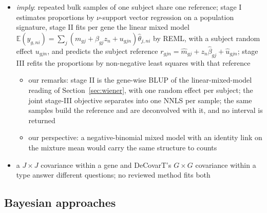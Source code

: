 \begin{itemize}
\begin{itemize}
    \item our remark: since \(\mathbf{1}^{\top}\boldsymbol{p}_{\cdot i}=1\),
          \(\boldsymbol{p}_{\cdot i}^{\top}(\boldsymbol{\Gamma}_{g}+c\mathbf{1}\mathbf{1}^{\top})\boldsymbol{p}_{\cdot i}=\boldsymbol{p}_{\cdot i}^{\top}\boldsymbol{\Gamma}_{g}\boldsymbol{p}_{\cdot i}+c\), so the constant
          part of \(\boldsymbol{\Gamma}_{g}\) and \(\tau_{g}^{2}\) are identified only together; the choice still moves the
          profiles of Theorem~1 and the cross-type correlations
    \item the von Neumann entropy of the cross-type correlation only stratifies genes at the median for evaluation; it
          does not filter them \cite[pp.~19--20]{chenUnicoUnifiedModelCell2025}
  \end{itemize}
  \item \emph{imply}: repeated bulk samples of one subject share one reference; stage I estimates proportions by
        \(\nu\)-support vector regression on a population signature, stage II fits per gene the linear mixed model
        \(\mathbb{E}(y_{g,ni})=\sum_{j}(m_{gj}+\beta_{gj}z_{n}+u_{gjn})\hat\theta_{j,ni}\) by REML, with a subject random effect
        \(u_{gjn}\), and predicts the subject reference \(r_{gjn}=\hat m_{gj}+z_{n}\hat\beta_{gj}+\hat u_{gjn}\); stage III refits
        the proportions by non-negative least squares with that reference \cite[pp.~4--5]{mengImplyImprovingCelltype2024}
  \begin{itemize}
    \item our remarks: stage II is the gene-wise BLUP of the linear-mixed-model reading of Section~\ref{sec:wiener}, with
          one random effect per subject; the joint stage-III objective separates into one NNLS per sample; the same
          samples build the reference and are deconvolved with it, and no interval is returned
    \item our perspective: a negative-binomial mixed model with an identity link on the mixture mean would carry the
          same structure to counts
  \end{itemize}
  \item a \(J\times J\) covariance within a gene and DeCovarT's \(G\times G\) covariance within a type answer different
        questions; no reviewed method fits both
\end{itemize}

\subsection{Bayesian approaches}

